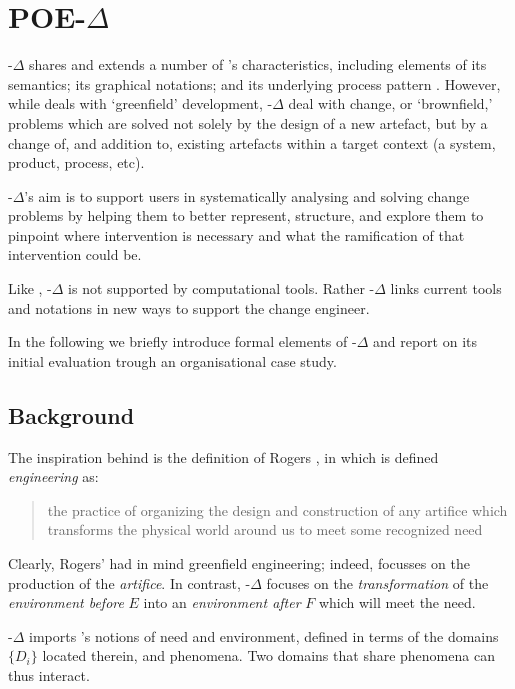 \documentclass[runningheads,a4paper]{llncs}
\begin{document}
\section{POE-$\Delta$}
\label{sect:POEDelta}
\POE{}-$\Delta$ shares and extends a number of \POE{}'s characteristics, including elements of its semantics; its graphical notations; and its underlying process pattern \cite{Hall2009JAdvSysMeas}. However, while \POE{} deals with `greenfield' development, \POE{}-$\Delta$ deal with change, or  `brownfield,' problems which are solved not solely by the design of a new artefact, but by a change of, and addition to, existing artefacts within a target context (a system, product, process, etc).

\POE{}-$\Delta$'s aim is to support users in systematically analysing and solving change problems by helping them to better represent, structure, and explore them to pinpoint where intervention is necessary and what the ramification of that intervention could be.

Like \POE{}, \POE{}-$\Delta$ is not supported by computational tools. Rather \POE{}-$\Delta$ links current tools and notations in new ways to support the change engineer.

In the following we briefly introduce formal elements of \POE{}-$\Delta$ and report on its initial evaluation trough an organisational case study.

\subsection{Background}
\label{theory}

The inspiration behind \POE{} is the definition of Rogers \cite{rogers1983nature}, in which is defined \textit{engineering} as:
%
\begin{quotation}
 the practice of organizing the design and construction of any artifice which transforms the physical world around us to meet some recognized need 
\end{quotation}
%
Clearly, Rogers' had in mind greenfield engineering; indeed, \POE{} focusses on the production of the \textit{artifice}. In contrast, \POE{}-$\Delta$ focuses on the \textit{transformation} of the \textit{environment before} $E$ into an \textit{environment after} $F$ which will meet the need.

\POE{}-$\Delta$ imports \POE{}'s notions of need and environment, defined in terms of the domains $\{D_i\}$ located therein, and phenomena. Two domains that share phenomena can thus interact. 
\end{document}
